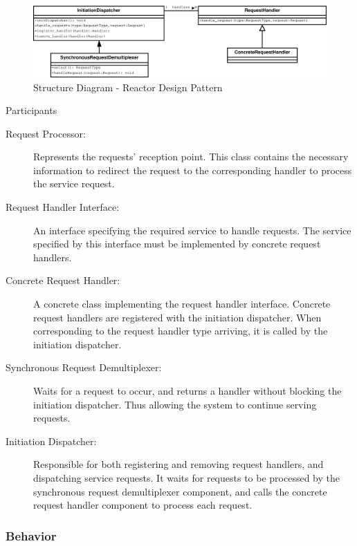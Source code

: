 \begin{figure}
	\centering
	\includegraphics*[width=1\textwidth, keepaspectratio=false]{fig/image4.eps}
	\caption{Structure Diagram - Reactor Design Pattern}
	\label{fig:str_diagram_r}
\end{figure}


\begin{description}
	\item[Participants]
\end{description}

\begin{description}
	\item[Request Processor:]
	Represents the requests' reception point. This class contains the necessary information to redirect the request to the corresponding handler to process the service request.
	
	\item[Request Handler Interface:]
	An interface specifying the required service to handle requests. The service specified by this interface must be implemented by concrete request handlers. 
	
	\item[Concrete Request Handler:]
	A concrete class implementing the request handler interface.  Concrete request handlers are registered with the initiation dispatcher. When corresponding to the request handler type arriving, it is called by the initiation dispatcher.
	
	\item[Synchronous Request Demultiplexer:]
	Waits for a request to occur, and returns a handler without blocking the initiation dispatcher. Thus allowing the system to continue serving requests.
	
	\item[Initiation Dispatcher:]
	Responsible for both registering and removing request handlers, and dispatching service requests. It waits for requests to be processed by the synchronous request demultiplexer component, and calls the concrete request handler component to process each request.
\end{description}

\subsubsection{Behavior}

